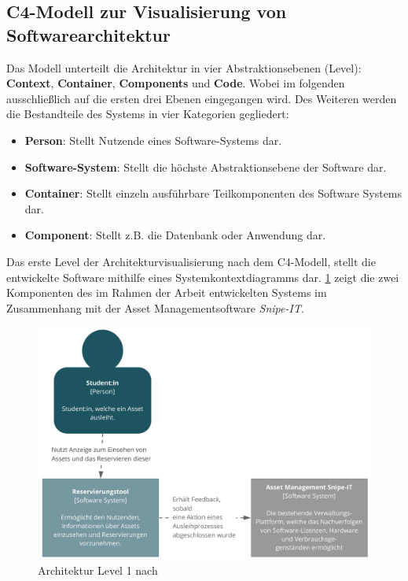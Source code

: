 \subsection{C4-Modell zur Visualisierung von Softwarearchitektur}
Das Modell unterteilt die Architektur in vier Abstraktionsebenen (Level):
\textbf{Context}, \textbf{Container}, \textbf{Components} und \textbf{Code}.
Wobei im folgenden ausschließlich auf die ersten drei Ebenen eingegangen wird.
Des Weiteren werden die Bestandteile des Systems in vier Kategorien gegliedert:

\begin{itemize}
    \item \textbf{Person}: Stellt Nutzende eines Software-Systems dar.
    \item \textbf{Software-System}: Stellt die höchste Abstraktionsebene der
          Software dar.
    \item \textbf{Container}: Stellt einzeln ausführbare Teilkomponenten des
          Software Systems dar.
    \item \textbf{Component}: Stellt z.B. die Datenbank oder Anwendung dar.
\end{itemize}

{\sffamily\color{maincolor}{Level 1: Context}}

Das erste Level der Architekturvisualisierung nach dem C4-Modell, stellt die
entwickelte Software mithilfe eines Systemkontextdiagramms dar. \ref{fig:level1}
zeigt die zwei Komponenten des im Rahmen der Arbeit entwickelten Systems im
Zusammenhang mit der Asset Managementsoftware \textit{Snipe-IT}.

\begin{figure}[h]
    \centering
    \includegraphics[scale=0.4]{Bilder/C4_1.pdf}
    \caption[Architektur Level 1]{Architektur Level 1 nach
        }
    \label{fig:level1}
\end{figure}

